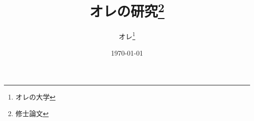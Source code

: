 \documentclass[a4paper,uplatex]{jsreport}
\begin{document}
\title{オレの研究\thanks{修士論文}}
\author{オレ\thanks{オレの大学}}
\date{\today} %

\maketitle %
\tableofcontents %




\end{document}

